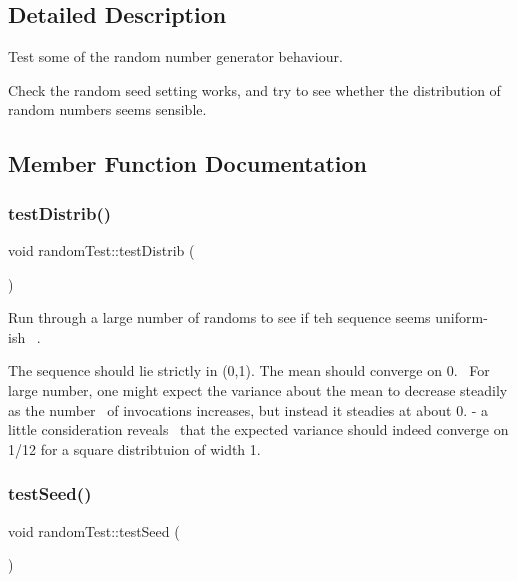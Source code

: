\subsection{Detailed Description}
Test some of the random number generator behaviour. 

Check the random seed setting works, and try to see whether the distribution of random numbers seems sensible. 

\subsection{Member Function Documentation}
\mbox{\label{classrandomTest_ac6d278a9b086e084f8657453b5e63c07}} 
\subsubsection{\texorpdfstring{test\+Distrib()}{testDistrib()}}
{\footnotesize\ttfamily void random\+Test\+::test\+Distrib (\begin{DoxyParamCaption}{ }\end{DoxyParamCaption})\hspace{0.3cm}{\ttfamily [inline]}}



Run through a large number of randoms to see if teh sequence seems uniform-\/ish~\newline
. 

The sequence should lie strictly in (0,1). The mean should converge on 0.~\newline
For large number, one might expect the variance about the mean to decrease steadily as the number~\newline
of invocations increases, but instead it steadies at about 0. -\/ a little consideration reveals~\newline
that the expected variance should indeed converge on 1/12 for a square distribtuion of width 1. \mbox{\label{classrandomTest_ae7119042c8ecfe9f350cd5b0d6c11906}} 
\subsubsection{\texorpdfstring{test\+Seed()}{testSeed()}}
{\footnotesize\ttfamily void random\+Test\+::test\+Seed (\begin{DoxyParamCaption}{ }\end{DoxyParamCaption})\hspace{0.3cm}{\ttfamily [inline]}}



